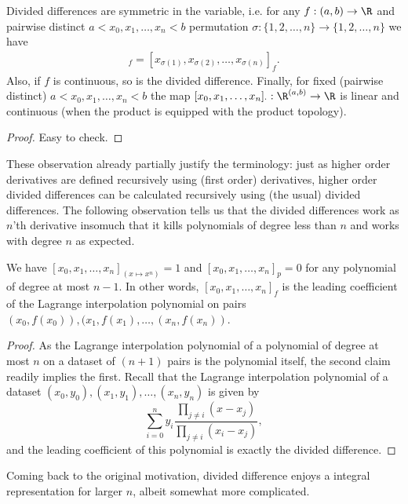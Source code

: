 \begin{prop}
	Divided differences are symmetric in the variable, i.e. for any $f : (a, b) \to \R$ and pairwise distinct $a < x_{0}, x_{1}, \ldots, x_{n} < b$ permutation $\sigma : \{1, 2, \ldots, n\} \to \{1, 2, \ldots, n\}$ we have
	\begin{align*}
		[x_{1}, x_{2}, \ldots, x_{n}]_{f} = [x_{\sigma(1)}, x_{\sigma(2)}, \ldots, x_{\sigma(n)}]_{f}.
	\end{align*}
	Also, if $f$ is continuous, so is the divided difference.
	Finally, for fixed (pairwise distinct) $a < x_{0}, x_{1}, \ldots, x_{n} < b$ the map $[x_{0}, x_{1}, \ldots, x_{n}]_{\cdot} : \R^{(a, b)} \to \R$ is linear and continuous (when the product is equipped with the product topology).
\end{prop}
\begin{proof}
	Easy to check.
\end{proof}

These observation already partially justify the terminology: just as higher order derivatives are defined recursively using (first order) derivatives, higher order divided differences can be calculated recursively using (the usual) divided differences. The following observation tells us that the divided differences work as $n$'th derivative insomuch that it kills polynomials of degree less than $n$ and works with degree $n$ as expected.

\begin{prop}\label{lagrange_divided}
We have $[x_{0}, x_{1}, \ldots, x_{n}]_{(x \mapsto x^{n})} = 1$ and $[x_{0}, x_{1}, \ldots, x_{n}]_{p} = 0$ for any polynomial of degree at most $n - 1$. In other words, $[x_{0}, x_{1}, \ldots, x_{n}]_{f}$ is the leading coefficient of the Lagrange interpolation polynomial on pairs $(x_{0}, f(x_{0})), (x_{1}, f(x_{1}), \ldots, (x_{n}, f(x_{n}))$.
\end{prop}
\begin{proof}
	As the Lagrange interpolation polynomial of a polynomial of degree at most $n$ on a dataset of $(n + 1)$ pairs is the polynomial itself, the second claim readily implies the first. Recall that the Lagrange interpolation polynomial of a dataset $(x_{0}, y_{0}), (x_{1}, y_{1}), \ldots, (x_{n}, y_{n})$ is given by
	\[
		\sum_{i = 0}^{n} y_{i} \frac{\prod_{j \neq i}(x - x_{j})}{\prod_{j \neq i}(x_{i} - x_{j})},
	\]
	and the leading coefficient of this polynomial is exactly the divided difference.
\end{proof}

Coming back to the original motivation, divided difference enjoys a integral representation for larger $n$, albeit somewhat more complicated.

